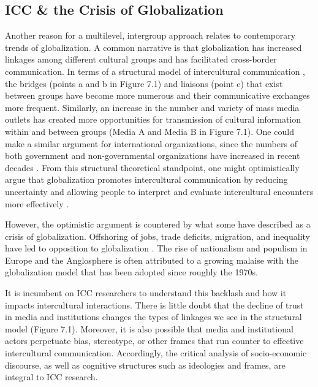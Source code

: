 \subsection{ICC \& the Crisis of Globalization}

Another reason for a multilevel, intergroup approach relates to contemporary trends of globalization. A common narrative is that globalization has increased linkages among different cultural groups and has facilitated cross-border communication. In terms of a structural model of intercultural communication \citep{Barnett2001,Barnett2005}, the bridges (points a and b in Figure 7.1) and liaisons (point c) that exist between groups have become more numerous and their communicative exchanges more frequent. Similarly, an increase in the number and variety of mass media outlets has created more opportunities for transmission of cultural information within and between groups (Media A and Media B in Figure 7.1). One could make a similar argument for international organizations, since the numbers of both government and non-governmental organizations have increased in recent decades \cite[][15, citing data from www.uia.be]{Marshall2011}. From this structural theoretical standpoint, one might optimistically argue that globalization promotes intercultural communication by reducing uncertainty and allowing people to interpret and evaluate intercultural encounters more effectively \citep{Barnett2001}.

However, the optimistic argument is countered by what some have described as a crisis of globalization. Offshoring of jobs, trade deficits, migration, and inequality have led to opposition to globalization \citep{Cerna2015,Martin2018}. The rise of nationalism and populism in Europe and the Anglosphere \citep{Bieber2018, Bonikowski2019} is often attributed to a growing malaise with the globalization model that has been adopted since roughly the 1970s. 

It is incumbent on ICC researchers to understand this backlash and how it impacts intercultural interactions. There is little doubt that the decline of trust in media and institutions \citep{Lenard2005} changes the types of linkages we see in the structural model (Figure 7.1). Moreover, it is also possible that media and institutional actors perpetuate bias, stereotype, or other frames that run counter to effective intercultural communication. Accordingly, the critical analysis of socio-economic discourse, as well as cognitive structures such as ideologies and frames, are integral to ICC research.

